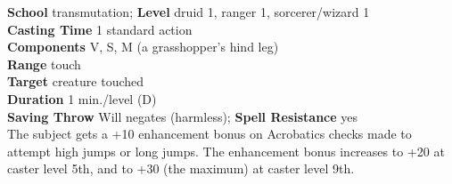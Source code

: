 \textbf{School} transmutation; \textbf{Level} druid 1, ranger 1, sorcerer/wizard 1\\
\textbf{Casting Time} 1 standard action\\
\textbf{Components} V, S, M (a grasshopper's hind leg)\\
\textbf{Range} touch\\
\textbf{Target} creature touched\\
\textbf{Duration} 1 min./level (D)\\
\textbf{Saving Throw }Will negates (harmless); \textbf{Spell Resistance} yes\\
The subject gets a +10 enhancement bonus on Acrobatics checks made to attempt high jumps or long jumps. The enhancement bonus increases to +20 at caster level 5th, and to +30 (the maximum) at caster level 9th.\\
